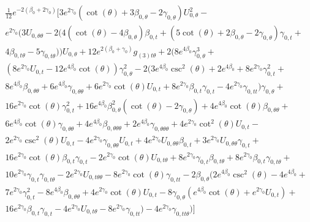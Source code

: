 \documentclass[a4paper,11pt]{article}
\numberwithin{equation}{section}
\begin{document}
\begin{align}
\begin{split}
&\frac{1}{12} e^{-2 (\beta_{0}+2 \gamma_{0})} [3 e^{2 \gamma_{0}} (\cot (\theta )+3 \beta_{0, \theta}-2 \gamma_{0, \theta}) U_{0, \theta}^2-\\
&e^{2 \gamma_{0}} (3 U_{0, \theta \theta}-2 (4 (\cot (\theta )-4 \beta_{0, \theta}) \beta_{0, t} +(5 \cot (\theta )+2 \beta_{0, \theta}-2 \gamma_{0, \theta}) \gamma_{0, t} +\\
&4 \beta_{0, t \theta} -5 \gamma_{0, t \theta} )) U_{0, \theta}+12 e^{2 (\beta_{0}+\gamma_{0})} g_{(3) t \theta}+2 (8 e^{4 \beta_{0}} \gamma_{0, \theta}^3+\\
&(8 e^{2 \gamma_{0}} U_{0, t} -12 e^{4 \beta_{0}} \cot (\theta )) \gamma_{0, \theta}^2-2 (3 e^{4 \beta_{0}} \csc ^2(\theta )+2 e^{4 \beta_{0}}+8 e^{2 \gamma_{0}} \gamma_{0, t} ^2+\\
&8 e^{4 \beta_{0}} \beta_{0, \theta \theta}+6 e^{4 \beta_{0}} \gamma_{0, \theta \theta}+6 e^{2 \gamma_{0}} \cot (\theta ) U_{0, t} +8 e^{2 \gamma_{0}} \beta_{0, t}  \gamma_{0, t} -4 e^{2 \gamma_{0}} \gamma_{0, tt}) \gamma_{0, \theta}+\\
&16 e^{2 \gamma_{0}} \cot (\theta ) \gamma_{0, t} ^2+16 e^{4 \beta_{0}} \beta_{0, \theta}^2 (\cot (\theta )-2 \gamma_{0, \theta})+4 e^{4 \beta_{0}} \cot (\theta ) \beta_{0, \theta \theta}+\\
&6 e^{4 \beta_{0}} \cot (\theta ) \gamma_{0, \theta \theta}+4 e^{4 \beta_{0}} \beta_{0, \theta \theta \theta} +2 e^{4 \beta_{0}} \gamma_{0, \theta \theta \theta} +4 e^{2 \gamma_{0}} \cot ^2(\theta ) U_{0, t} -\\
&2 e^{2 \gamma_{0}} \csc ^2(\theta ) U_{0, t} -4 e^{2 \gamma_{0}} \gamma_{0, \theta \theta} U_{0, t} +4 e^{2 \gamma_{0}} U_{0, \theta \theta} \beta_{0, t} +3 e^{2 \gamma_{0}} U_{0, \theta \theta} \gamma_{0, t} +\\
&16 e^{2 \gamma_{0}} \cot (\theta ) \beta_{0, t}  \gamma_{0, t} -2 e^{2 \gamma_{0}} \cot (\theta ) U_{0, t \theta} +8 e^{2 \gamma_{0}} \gamma_{0, t}  \beta_{0, t \theta} +8 e^{2 \gamma_{0}} \beta_{0, t}  \gamma_{0, t \theta} +\\
&10 e^{2 \gamma_{0}} \gamma_{0, t}  \gamma_{0, t \theta} -2 e^{2 \gamma_{0}} U_{0, t \theta \theta}-8 e^{2 \gamma_{0}} \cot (\theta ) \gamma_{0, tt}-2 \beta_{0, \theta} (2 e^{4 \beta_{0}} \csc ^2(\theta )-4 e^{4 \beta_{0}}+\\
&7 e^{2 \gamma_{0}} \gamma_{0, t} ^2-8 e^{4 \beta_{0}} \beta_{0, \theta \theta}+4 e^{2 \gamma_{0}} \cot (\theta ) U_{0, t} -8 \gamma_{0, \theta} (e^{4 \beta_{0}} \cot (\theta )+e^{2 \gamma_{0}} U_{0, t} )+\\
&16 e^{2 \gamma_{0}} \beta_{0, t}  \gamma_{0, t} -4 e^{2 \gamma_{0}} U_{0, t \theta} -8 e^{2 \gamma_{0}} \gamma_{0, tt})-4 e^{2 \gamma_{0}} \gamma_{0, tt \theta})]
\end{split}
\end{align}
\end{document}
